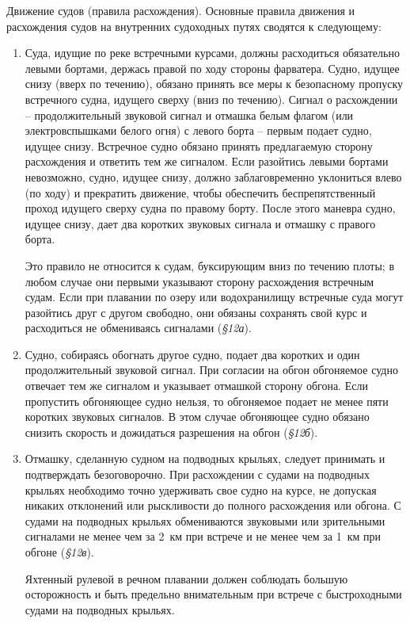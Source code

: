 \documentclass[a4paper, 12pt, twoside, final]{scrbook}
\begin{document}
Движение судов (правила расхождения). Основные правила движения и расхождения судов на внутренних судоходных путях сводятся к следующему:

\begin{enumerate}
\item Суда, идущие по реке встречными курсами, должны расходиться обязательно левыми бортами, держась правой по ходу стороны фарватера. Судно, идущее снизу (вверх по течению), обязано принять все меры к безопасному пропуску встречного судна, идущего сверху (вниз по течению). Сигнал о расхождении \--- продолжительный звуковой сигнал и отмашка белым флагом (или электровспышками белого огня) с левого борта \--- первым подает судно, идущее снизу. Встречное судно обязано принять предлагаемую сторону расхождения и ответить тем же сигналом. Если разойтись левыми бортами невозможно, судно, идущее снизу, должно заблаговременно уклониться влево (по ходу) и прекратить движение, чтобы обеспечить беспрепятственный проход идущего сверху судна по правому борту. После этого маневра судно, идущее снизу, дает два коротких звуковых сигнала и отмашку с правого борта.

Это правило не относится к судам, буксирующим вниз по течению плоты; в любом случае они первыми указывают сторону расхождения встречным судам. Если при плавании по озеру или водохранилищу встречные суда могут разойтись друг с другом свободно, они обязаны сохранять свой курс и расходиться не обмениваясь сигналами (\textit{\S 12а}).

\item Судно, собираясь обогнать другое судно, подает два коротких и один продолжительный звуковой сигнал. При согласии на обгон обгоняемое судно отвечает тем же сигналом и указывает отмашкой сторону обгона. Если пропустить обгоняющее судно нельзя, то обгоняемое подает не менее пяти коротких звуковых сигналов. В этом случае обгоняющее судно обязано снизить скорость и дожидаться разрешения на обгон (\textit{\S 12б}).

\item Отмашку, сделанную судном на подводных крыльях, следует принимать и подтверждать безоговорочно. При расхождении с судами на подводных крыльях необходимо точно удерживать свое судно на курсе, не допуская никаких отклонений или рыскливости до полного расхождения или обгона. С судами на подводных крыльях обмениваются звуковыми или зрительными сигналами не менее чем за 2~км при встрече и не менее чем за 1~км при обгоне (\textit{\S 12в}).

Яхтенный рулевой в речном плавании должен соблюдать большую осторожность и быть предельно внимательным при встрече с быстроходными судами на подводных крыльях.


\end{enumerate}
\end{document}
